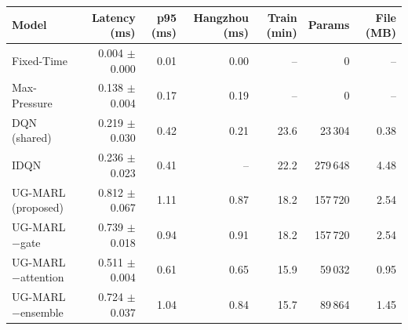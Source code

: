 \begin{tabular}{lrrrrrr}
\toprule
Model & Latency (ms) & p95 (ms) & Hangzhou (ms) & Train (min) & Params & File (MB) \\
\midrule
Fixed-Time & 0.004 $\pm$ 0.000 & 0.01 & 0.00 & -- & 0 & -- \\
Max-Pressure & 0.138 $\pm$ 0.004 & 0.17 & 0.19 & -- & 0 & -- \\
DQN (shared) & 0.219 $\pm$ 0.030 & 0.42 & 0.21 & 23.6 & 23\,304 & 0.38 \\
IDQN & 0.236 $\pm$ 0.023 & 0.41 & -- & 22.2 & 279\,648 & 4.48 \\
UG-MARL (proposed) & 0.812 $\pm$ 0.067 & 1.11 & 0.87 & 18.2 & 157\,720 & 2.54 \\
\midrule
UG-MARL $-$gate & 0.739 $\pm$ 0.018 & 0.94 & 0.91 & 18.2 & 157\,720 & 2.54 \\
UG-MARL $-$attention & 0.511 $\pm$ 0.004 & 0.61 & 0.65 & 15.9 & 59\,032 & 0.95 \\
UG-MARL $-$ensemble & 0.724 $\pm$ 0.037 & 1.04 & 0.84 & 15.7 & 89\,864 & 1.45 \\
\bottomrule
\end{tabular}
